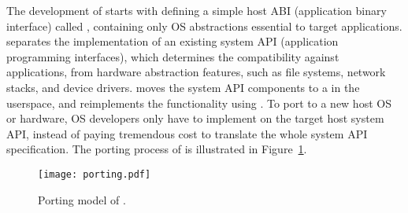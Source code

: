 \papersection{\Thehostabi{}}
\label{sec:overview:host}

The development of \graphene{} starts with defining a simple host ABI (application binary interface) called \thehostabi{},
containing only OS abstractions essential to target applications.
\Thehostabi{} separates
the implementation of an existing system API (application programming interfaces), which determines the compatibility against applications,
from hardware abstraction features, such as file systems, network stacks, and device drivers. 
\graphene{} moves the system API components
to a \libos{} in the userspace, and reimplements the functionality using \thehostabi{}.
To port \graphene{} to a new host OS or hardware,
OS developers only have to implement \thehostabi{} on the target host system API,
instead of paying tremendous cost to translate the whole system API specification. The porting process of \graphene{} is illustrated in Figure~\ref{fig:overview:porting}.





\begin{figure}[t!]
\centering
\texttt{[image: porting.pdf]}
\caption{Porting model of \graphene{}.}
\label{fig:overview:porting}
\end{figure}



\label{sec:overview:host:pal}


